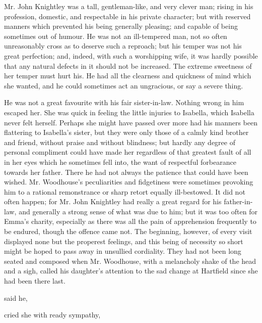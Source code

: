 Mr. John Knightley was a tall, gentleman-like, and very clever man; rising in his profession, domestic, and respectable in his private character; but with reserved manners which prevented his being generally pleasing; and capable of being sometimes out of humour. He was not an ill-tempered man, not so often unreasonably cross as to deserve such a reproach; but his temper was not his great perfection; and, indeed, with such a worshipping wife, it was hardly possible that any natural defects in it should not be increased. The extreme sweetness of her temper must hurt his. He had all the clearness and quickness of mind which she wanted, and he could sometimes act an ungracious, or say a severe thing.

He was not a great favourite with his fair sister-in-law. Nothing wrong in him escaped her. She was quick in feeling the little injuries to Isabella, which Isabella never felt herself. Perhaps she might have passed over more had his manners been flattering to Isabella's sister, but they were only those of a calmly kind brother and friend, without praise and without blindness; but hardly any degree of personal compliment could have made her regardless of that greatest fault of all in her eyes which he sometimes fell into, the want of respectful forbearance towards her father. There he had not always the patience that could have been wished. Mr. Woodhouse's peculiarities and fidgetiness were sometimes provoking him to a rational remonstrance or sharp retort equally ill-bestowed. It did not often happen; for Mr. John Knightley had really a great regard for his father-in-law, and generally a strong sense of what was due to him; but it was too often for Emma's charity, especially as there was all the pain of apprehension frequently to be endured, though the offence came not. The beginning, however, of every visit displayed none but the properest feelings, and this being of necessity so short might be hoped to pass away in unsullied cordiality. They had not been long seated and composed when Mr. Woodhouse, with a melancholy shake of the head and a sigh, called his daughter's attention to the sad change at Hartfield since she had been there last.

 said he, 

 cried she with ready sympathy, 

